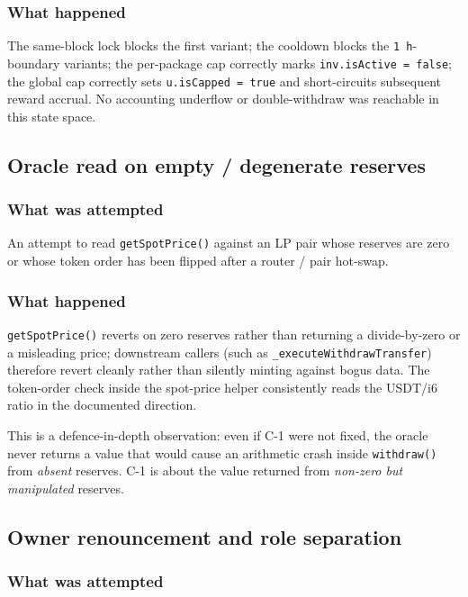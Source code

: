 \documentclass[11pt,a4paper]{article}
\begin{document}
\subsubsection*{What happened}

The same-block lock blocks the first variant; the cooldown blocks the
\texttt{1 h}-boundary variants; the per-package cap correctly marks
\texttt{inv.isActive = false}; the global cap correctly sets
\texttt{u.isCapped = true} and short-circuits subsequent reward accrual.
No accounting underflow or double-withdraw was reachable in this state
space.

\subsection{Oracle read on empty / degenerate reserves}

\subsubsection*{What was attempted}

An attempt to read \texttt{getSpotPrice()} against an LP pair whose
reserves are zero or whose token order has been flipped after a router /
pair hot-swap.

\subsubsection*{What happened}

\texttt{getSpotPrice()} reverts on zero reserves rather than returning a
divide-by-zero or a misleading price; downstream callers (such as
\texttt{\_executeWithdrawTransfer}) therefore revert cleanly rather than
silently minting against bogus data. The token-order check inside the
spot-price helper consistently reads the USDT/i6 ratio in the documented
direction.

This is a defence-in-depth observation: even if C-1 were not fixed, the
oracle never returns a value that would cause an arithmetic crash inside
\texttt{withdraw()} from \emph{absent} reserves. C-1 is about the value
returned from \emph{non-zero but manipulated} reserves.

\subsection{Owner renouncement and role separation}

\subsubsection*{What was attempted}
\end{document}
